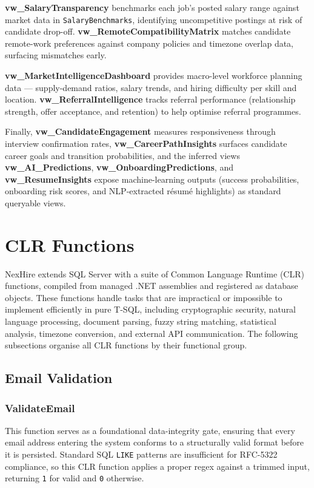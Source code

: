 \documentclass[11pt,a4paper]{article}
\begin{document}
\textbf{vw\_SalaryTransparency} benchmarks each job's posted salary range against market data in \texttt{SalaryBenchmarks}, identifying uncompetitive postings at risk of candidate drop-off. \textbf{vw\_RemoteCompatibilityMatrix} matches candidate remote-work preferences against company policies and timezone overlap data, surfacing mismatches early.

\textbf{vw\_MarketIntelligenceDashboard} provides macro-level workforce planning data — supply-demand ratios, salary trends, and hiring difficulty per skill and location. \textbf{vw\_ReferralIntelligence} tracks referral performance (relationship strength, offer acceptance, and retention) to help optimise referral programmes.

Finally, \textbf{vw\_CandidateEngagement} measures responsiveness through interview confirmation rates, \textbf{vw\_CareerPathInsights} surfaces candidate career goals and transition probabilities, and the inferred views \textbf{vw\_AI\_Predictions}, \textbf{vw\_OnboardingPredictions}, and \textbf{vw\_ResumeInsights} expose machine-learning outputs (success probabilities, onboarding risk scores, and NLP-extracted résumé highlights) as standard queryable views.


\section{CLR Functions}

\noindent
NexHire extends SQL Server with a suite of Common Language Runtime (CLR) functions, compiled from managed .NET assemblies and registered as database objects. These functions handle tasks that are impractical or impossible to implement efficiently in pure T-SQL, including cryptographic security, natural language processing, document parsing, fuzzy string matching, statistical analysis, timezone conversion, and external API communication. The following subsections organise all CLR functions by their functional group.

\subsection{Email Validation}

\subsubsection{ValidateEmail}
\noindent
This function serves as a foundational data-integrity gate, ensuring that every email address entering the system conforms to a structurally valid format before it is persisted. Standard SQL \texttt{LIKE} patterns are insufficient for RFC-5322 compliance, so this CLR function applies a proper regex against a trimmed input, returning \texttt{1} for valid and \texttt{0} otherwise.
\end{document}
